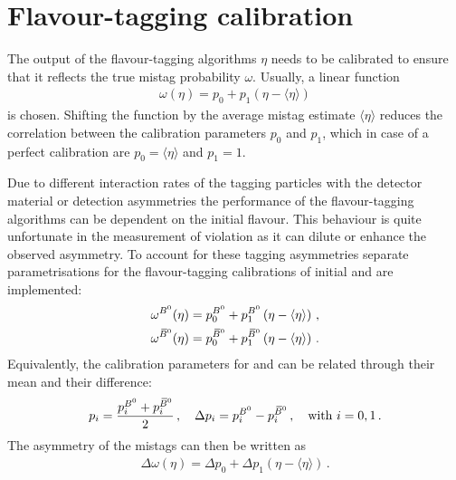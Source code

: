 
\section{Flavour-tagging calibration}
\label{sec:dataanalysis:taggingcalibration}

The output of the flavour-tagging algorithms $\eta$ needs to be calibrated to
ensure that it reflects the true mistag probability $\omega$. Usually, a
linear function
\begin{align}
	\omega(\eta) = p_0 + p_1 (\eta - \langle\eta\rangle)
\label{eq:dataanalysis:taggingcalibration:generalfunction}
\end{align}
is chosen. Shifting the function by the average mistag estimate
$\langle\eta\rangle$ reduces the correlation between the calibration
parameters $p_0$ and $p_1$, which in case of a perfect calibration are
$p_0 = \langle\eta\rangle$ and $p_1 = 1$.

Due to different interaction rates of the tagging particles with the detector
material or detection asymmetries the performance of the flavour-tagging
algorithms can be dependent on the initial flavour. This behaviour is quite
unfortunate in the measurement of \CP violation as it can dilute or enhance
the observed asymmetry. To account for these tagging asymmetries separate
parametrisations for the flavour-tagging calibrations of initial \Bd and \Bzb
are implemented:
\begin{equation}
\begin{split}
  \omega^{{{B}^0} }(\eta) = p_0^{{{B}^0} } + p_1^{{{B}^0} }\left(\eta - \langle\eta\rangle\right) \, , \\
  \omega^{{{\kern 0.18em\overline{\kern -0.18em B}{}}{}^0}}(\eta) = p_0^{{{\kern 0.18em\overline{\kern -0.18em B}{}}{}^0}} + p_1^{{{\kern 0.18em\overline{\kern -0.18em B}{}}{}^0}}\left(\eta - \langle\eta\rangle\right) \, .
\end{split}
\label{eq:dataanalysis:taggingcalibration:individual_parametrisations}
\end{equation}
Equivalently, the calibration parameters for \Bd and \Bzb can be related
through their mean and their difference:
\begin{equation}
  p_i        = \frac{p_i^{{{B}^0} } + p_i^{{{\kern 0.18em\overline{\kern -0.18em B}{}}{}^0}}}{2} \, , \quad
  \Delta p_i = p_i^{{{B}^0} } - p_i^{{{\kern 0.18em\overline{\kern -0.18em B}{}}{}^0}} \, , \quad
  \text{with }i = 0,1 \,.
\label{eq:dataanalysis:taggingcalibration:individual_pis}
\end{equation}
The asymmetry of the mistags can then be written as
\begin{align}
	\Delta\omega(\eta) = \Delta p_0 + \Delta p_1 (\eta - \langle\eta\rangle)\,.
\label{eq:dataanalysis:taggingcalibration:mistagasymmetry}
\end{align}

